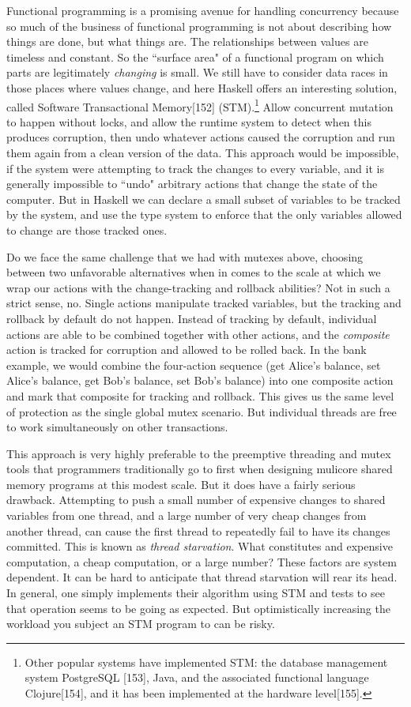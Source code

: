 \documentclass[]{article}
\begin{document}
Functional programming is a promising avenue for handling concurrency
because so much of the business of functional programming is not about
describing how things are done, but what things are. The relationships
between values are timeless and constant. So the ``surface area" of a
functional program on which parts are legitimately \emph{changing} is
small. We still have to consider data races in those places where values
change, and here Haskell offers an interesting solution, called Software
Transactional Memory{[}152{]} (STM).\footnote{Other popular systems have
  implemented STM: the database management system PostgreSQL {[}153{]},
  Java, and the associated functional language Clojure{[}154{]}, and it
  has been implemented at the hardware level{[}155{]}.} Allow concurrent
mutation to happen without locks, and allow the runtime system to detect
when this produces corruption, then undo whatever actions caused the
corruption and run them again from a clean version of the data. This
approach would be impossible, if the system were attempting to track the
changes to every variable, and it is generally impossible to ``undo"
arbitrary actions that change the state of the computer. But in Haskell
we can declare a small subset of variables to be tracked by the system,
and use the type system to enforce that the only variables allowed to
change are those tracked ones.

Do we face the same challenge that we had with mutexes above, choosing
between two unfavorable alternatives when in comes to the scale at which
we wrap our actions with the change-tracking and rollback abilities? Not
in such a strict sense, no. Single actions manipulate tracked variables,
but the tracking and rollback by default do not happen. Instead of
tracking by default, individual actions are able to be combined together
with other actions, and the \emph{composite} action is tracked for
corruption and allowed to be rolled back. In the bank example, we would
combine the four-action sequence (get Alice's balance, set Alice's
balance, get Bob's balance, set Bob's balance) into one composite action
and mark that composite for tracking and rollback. This gives us the
same level of protection as the single global mutex scenario. But
individual threads are free to work simultaneously on other
transactions.

This approach is very highly preferable to the preemptive threading and
mutex tools that programmers traditionally go to first when designing
mulicore shared memory programs at this modest scale. But it does have a
fairly serious drawback. Attempting to push a small number of expensive
changes to shared variables from one thread, and a large number of very
cheap changes from another thread, can cause the first thread to
repeatedly fail to have its changes committed. This is known as
\emph{thread starvation}. What constitutes and expensive computation, a
cheap computation, or a large number? These factors are system
dependent. It can be hard to anticipate that thread starvation will rear
its head. In general, one simply implements their algorithm using STM
and tests to see that operation seems to be going as expected. But
optimistically increasing the workload you subject an STM program to can
be risky.
\end{document}

